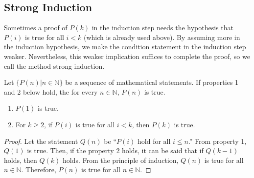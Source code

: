 \documentclass[../main.tex]{subfiles}
\begin{document}
\subsection{Strong Induction}
Sometimes a proof of $P(k)$ in the induction step needs the hypothesis that $P(i)$ is true for all $i < k$ (which is already used above).
By assuming more in the induction hypothesis, we make the condition statement in the induction step weaker.
Nevertheless, this weaker implication suffices to complete the proof, so we call the method \textsf{strong induction}.

\begin{thm}  \label{thm:stronginduction}
    Let $\{P(n) | n \in \mathbb{N} \}$ be a sequence of mathematical statements.
    If properties 1 and 2 below hold, the for every $n \in \mathbb N$, $P(n)$ is true.
    \begin{enumerate}
        \item $P(1)$ is true.
        \item For $k \geq 2$, if $P(i)$ is true for all $i < k$, then $P(k)$ is true.
    \end{enumerate}
\end{thm}
\begin{proof}
    Let the statement $Q(n)$ be ``$P(i)$ hold for all $i \leq n$.''
    From property 1, $Q(1)$ is true.
    Then, if the property 2 holds, it can be said that if $Q(k-1)$ holds, then $Q(k)$ holds.
    From the principle of induction, $Q(n)$ is true for all $n \in \mathbb N$.
    Therefore, $P(n)$ is true for all $n \in \mathbb N$.
\end{proof}
\end{document}
